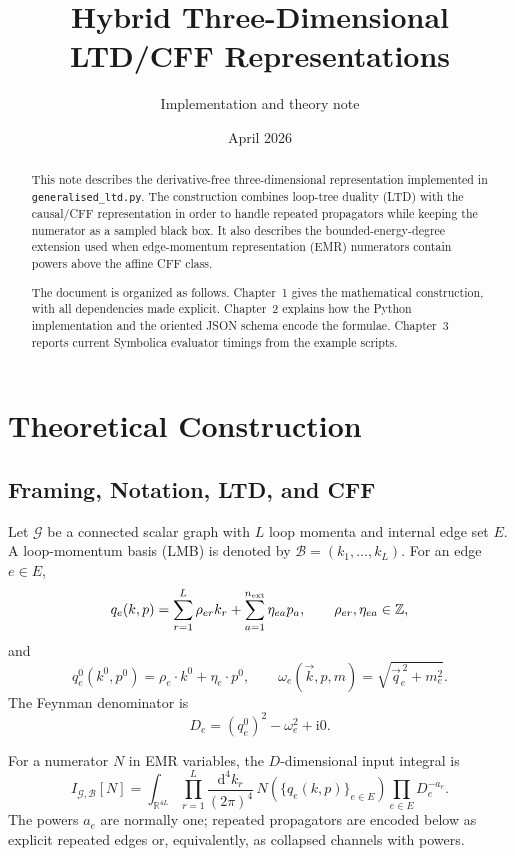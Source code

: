 \documentclass[11pt,a4paper]{report}
\title{Hybrid Three-Dimensional LTD/CFF Representations}
\author{Implementation and theory note}
\date{April 2026}
\newcommand{\dd}{\mathrm{d}}
\newcommand{\ii}{\mathrm{i}}
\newcommand{\Graph}{\mathcal G}
\newcommand{\Basis}{\mathcal B}
\begin{document}
\maketitle

\begin{abstract}
This note describes the derivative-free three-dimensional representation
implemented in \texttt{generalised\_ltd.py}.  The construction combines loop-tree
duality (LTD) with the causal/CFF representation in order to handle repeated
propagators while keeping the numerator as a sampled black box.  It also
describes the bounded-energy-degree extension used when edge-momentum
representation (EMR) numerators contain powers above the affine CFF class.

The document is organized as follows.  Chapter~1 gives the mathematical
construction, with all dependencies made explicit.  Chapter~2 explains how the
Python implementation and the oriented JSON schema encode the formulae.
Chapter~3 reports current Symbolica evaluator timings from the example scripts.
\end{abstract}

\tableofcontents

\chapter{Theoretical Construction}

\section{Framing, Notation, LTD, and CFF}

Let \(\Graph\) be a connected scalar graph with \(L\) loop momenta and internal
edge set \(E\).  A loop-momentum basis (LMB) is denoted by
\(\Basis=(k_1,\ldots,k_L)\).  For an edge \(e\in E\),
\begin{equation}
  q_e(k,p)=\sum_{r=1}^{L}\rho_{er}k_r+\sum_{a=1}^{n_{\rm ext}}\eta_{ea}p_a,
  \qquad \rho_{er},\eta_{ea}\in\mathbb Z ,
\end{equation}
and
\begin{equation}
  q_e^0(k^0,p^0)=\rho_e\cdot k^0+\eta_e\cdot p^0,\qquad
  \omega_e(\vec k,p,m)=\sqrt{\vec q_e^{\,2}+m_e^2}.
\end{equation}
The Feynman denominator is
\begin{equation}
  D_e=(q_e^0)^2-\omega_e^2+\ii0 .
\end{equation}

For a numerator \(N\) in EMR variables, the \(D\)-dimensional input integral is
\begin{equation}
  I_{\Graph,\Basis}[N]
  =
  \int_{\mathbb R^{4L}}
  \prod_{r=1}^{L}\frac{\dd^4 k_r}{(2\pi)^4}\,
  N(\{q_e(k,p)\}_{e\in E})
  \prod_{e\in E}D_e^{-a_e}.
  \label{eq:four-dimensional-integral}
\end{equation}
The powers \(a_e\) are normally one; repeated propagators are encoded below as
explicit repeated edges or, equivalently, as collapsed channels with powers.
\end{document}

